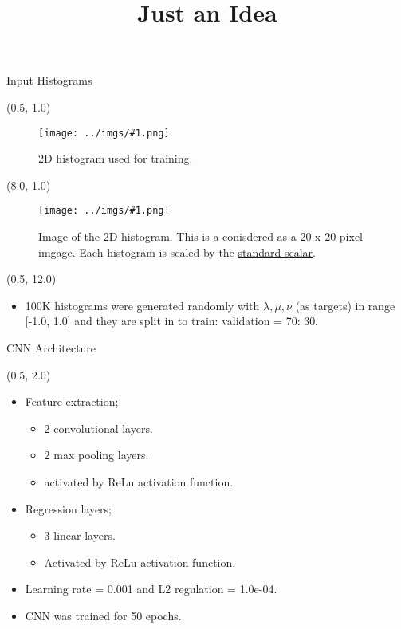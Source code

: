 \documentclass[10pt, xcolor={dvipsnames}, aspectratio = 169, sans,mathserif]{beamer}
\title{Just an Idea}
\newcommand{\leftpic}[2]
{
\begin{textblock}{7.0}(0.5, 1.0)
\begin{figure}
    \centering
    \texttt{[image: ../imgs/\#1.png]}
    \caption{#2}
\end{figure}
\end{textblock}
}
\newcommand{\rightpic}[2]
{
\begin{textblock}{7.0}(8.0, 1.0)
\begin{figure}
    \centering
    \texttt{[image: ../imgs/\#1.png]}
    \caption{#2}
\end{figure}
\end{textblock}
}
\begin{document}
\begin{frame}
    \maketitle
\end{frame}

\begin{frame}[fragile]{Input Histograms}

\leftpic{input_hist}{2D histogram used for training.}

\rightpic{gray_scale}{Image of the 2D histogram. This is a conisdered as a 20 x 20 pixel imgage. Each histogram is scaled by the \href{https://scikit-learn.org/stable/modules/generated/sklearn.preprocessing.StandardScaler.html}{standard scalar}.}

\begin{textblock}{15.0}(0.5, 12.0)
\begin{itemize}

    \item 100K histograms were generated randomly with $\lambda, \mu, \nu$ (as targets) in range [-1.0, 1.0] and they are split in to train: validation = 70: 30.

\end{itemize}
\end{textblock}
\end{frame}

\begin{frame}{CNN Architecture}
\begin{textblock}{15.0}(0.5, 2.0)
\begin{itemize}

    \item Feature extraction;

    \begin{itemize}
        \item 2 convolutional layers.
        \item 2 max pooling layers.
        \item activated by ReLu activation function.
    \end{itemize}

    \item Regression layers;

    \begin{itemize}
        \item 3 linear layers.
        \item Activated by ReLu activation function.
    \end{itemize}

    \item Learning rate = 0.001 and L2 regulation = 1.0e-04.

    \item CNN was trained for 50 epochs.
\end{itemize}
\end{textblock}
\end{frame}
\end{document}
